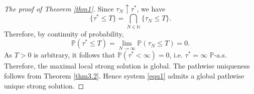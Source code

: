 \documentclass[reqno, 11pt]{amsart}
\theoremstyle{definition}
\numberwithin{equation}{section} \numberwithin{lem}{section}
\numberwithin{thm}{section} \numberwithin{prop}{section}
\numberwithin{cor}{section} \numberwithin{rem}{section}
\numberwithin{defn}{section}
\begin{document}
\begin{proof}[The proof of Theorem \ref{thm1}]
       Since $\tau_N\uparrow\tau^*$, we have
	\[
	\{\tau^*\le T\}=\bigcap_{N\in\mathbb N}\{\tau_N\le T\}.
	\]
	Therefore, by continuity of probability,
	\[
	\mathbb P(\tau^*\le T)=\lim_{N\to\infty}\mathbb P(\tau_N\le T)=0.
	\]
	As $T>0$ is arbitrary, it follows that $\mathbb P(\tau^*<\infty)=0$, i.e. $\tau^*=\infty$ $\mathbb P$-a.s. Therefore, the maximal local strong solution is global. The pathwise uniqueness follows from Theorem \ref{thm3.2}. Hence system \eqref{equ1} admits a global pathwise unique strong solution.
\end{proof}
   
    
    





 

 

    \nocite{*}
	
	
\end{document}
